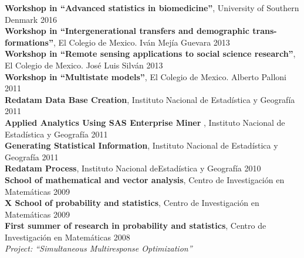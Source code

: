 \documentclass[12pt]{article}
\begin{document}
 \textbf{Workshop in ``Advanced statistics in biomedicine''}, University of Southern Denmark \hfill { 2016}\\

 \textbf{Workshop in ``Intergenerational transfers and demographic trans- formations''}, El Colegio de Mexico. Iv\'an Mej\'ia Guevara \hfill { 2013}\\

 \textbf{Workshop in ``Remote sensing applications to social science research''}, El Colegio de Mexico. Jos\'e Luis Silv\'an \hfill { 2013}\\
 
 \textbf{Workshop in ``Multistate models''}, El Colegio de Mexico. Alberto Palloni \hfill { 2011}\\
 
  \textbf{Redatam Data Base Creation}, Instituto Nacional de Estad\'istica y Geograf\'ia \hfill { 2011}\\

  \textbf{Applied Analytics Using SAS Enterprise Miner }, Instituto Nacional de Estad\'istica y Geograf\'ia \hfill { 2011}\\
  
   \textbf{Generating Statistical Information}, Instituto Nacional de Estad\'istica y Geograf\'ia \hfill { 2011}\\
    
   \textbf{Redatam Process}, Instituto Nacional deEstad\'istica y Geograf\'ia \hfill { 2010}\\
   
    \textbf{School of mathematical and vector analysis}, Centro de Investigaci\'on en Matem\'aticas \hfill { 2009}\\

    \textbf{X School of probability and statistics}, Centro de Investigaci\'on en Matem\'aticas \hfill { 2009}\\
    
        \textbf{First summer of research in probability and statistics}, Centro de Investigaci\'on en Matem\'aticas \hfill { 2008}\\
		 \emph{Project: ``Simultaneous Multiresponse Optimization''}
		 

 
\end{document}
